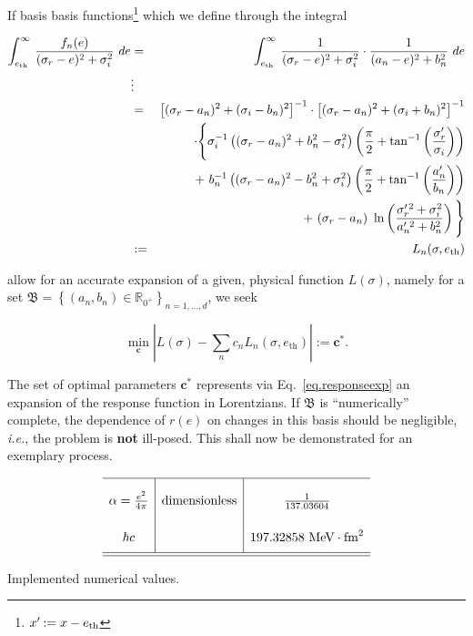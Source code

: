 \documentclass[onecolumn,preprint,superscriptaddress,nofootinbib,notitlepage,10pt,linenumbers]{revtex4-1}
\newcommand*{\mprime}{^{\prime}\mkern-1.2mu}
\newcommand*{\ethr}{e_\text{th}}
\newcommand{\ie}{\textit{i.e.}\;}
\newcommand{\be}{\begin{equation}}
\newcommand{\ee}{\end{equation}}
\newcommand{\la}{\label}
\newcommand{\ve}[1]{\ensuremath{\boldsymbol{#1}}}
\begin{document}
If basis basis functions\footnote{$x\mprime:=x-\ethr$} which we define through the integral

\begin{eqnarray}\la{eq.ltofl}
\int^\infty_{\ethr}\,\frac{f_n(e)}{(\sigma_r-e)^2+\sigma_i^2}~de
&=&\int_{\ethr}^\infty\,\frac{1}{(\sigma_r-e)^2+\sigma_i^2}\cdot
\frac{1}{(a_n-e)^2+b_n^2}~de\nonumber\\
&\vdots&\nonumber\\
&=&\left[(\sigma_r-a_n)^2+(\sigma_i-b_n)^2\right]^{-1}\cdot
\left[(\sigma_r-a_n)^2+(\sigma_i+b_n)^2\right]^{-1}\nonumber\\
&&\cdot
\Bigg\lbrace
\sigma_i^{-1}\left((\sigma_r-a_n)^2+b_n^2-\sigma_i^2\right)
\left(\frac{\pi}{2}+\tan^{-1}\left(\frac{\sigma_r\mprime}{\sigma_i}\right)\right)\nonumber\\
&&+~
b_n^{-1}\left((\sigma_r-a_n)^2-b_n^2+\sigma_i^2\right)
\left(\frac{\pi}{2}+\tan^{-1}\left(\frac{a_n\mprime}{b_n}\right)\right)\nonumber\\&&+~
(\sigma_r-a_n)~\ln\left(\frac{\sigma_r\mprime^2+\sigma_i^2}{a_n\mprime^2+b_n^2}
\right)
\Bigg\rbrace\nonumber\\
&:=&L_n(\sigma,\ethr)
\end{eqnarray}

allow for an accurate expansion of a given, physical function $L(\sigma)$,
namely for a set $\mathfrak{B}=\left\lbrace (a_n,b_n)\in\mathbb{R}_{0^+}\right\rbrace_{n=1,\ldots,d}$,
we seek

\be
\min_{\ve{c}}\left\vert L(\sigma)-\sum_nc_nL_n(\sigma,\ethr)\right\vert:=\ve{c}^*.
\ee

The set of optimal parameters $\ve{c}^*$ represents via Eq.~\eqref{eq.responseexp} an expansion
of the response function in Lorentzians.
If $\mathfrak{B}$ is ``numerically'' complete, the dependence of $r(e)$ on changes
in this basis should be negligible, \ie, the problem is {\bf not} ill-posed.
This shall now be demonstrated for an exemplary process.



\begin{table}
\be\la{tab.constants}
\renewcommand{\arraystretch}{2.4}
\setlength{\tabcolsep}{8pt}
\begin{array}{c|c|c}\hline
\alpha=\frac{e^2}{4\pi}&\text{dimensionless}&\frac{1}{137.03604}\\
\hbar c & & 197.32858~\text{MeV}\cdot\text{fm}^2 \\
\hline\hline
\end{array}
\ee
\caption{Implemented numerical values.}
\end{table}
\end{document}

